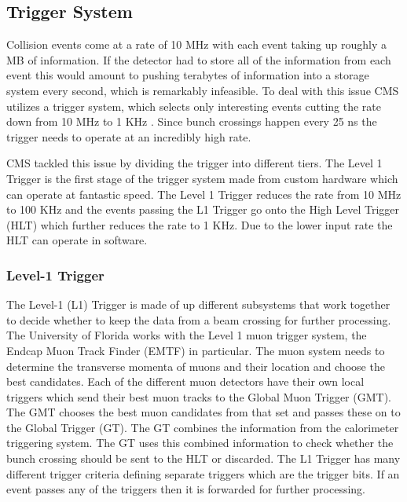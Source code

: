 \subsection{Trigger System}
Collision events come at a rate of 10 MHz with each event taking up roughly a MB of information. If the detector had to store all of the information from each event this would amount to pushing terabytes of information into a storage system every second, which is remarkably infeasible. To deal with this issue CMS utilizes a trigger system, which selects only interesting events cutting the rate down from 10 MHz to 1 KHz \cite{cmsexp}. Since bunch crossings happen every 25 ns the trigger needs to operate at an incredibly high rate.

CMS tackled this issue by dividing the trigger into different tiers. The Level 1 Trigger is the first stage of the trigger system made from custom hardware which can operate at fantastic speed. The Level 1 Trigger reduces the rate from 10 MHz to 100 KHz and the events passing the L1 Trigger go onto the High Level Trigger (HLT) which further reduces the rate to 1 KHz. Due to the lower input rate the HLT can operate in software.

\subsubsection{Level-1 Trigger}

The Level-1 (L1) Trigger is made of up different subsystems that work together to decide whether to keep the data from a beam crossing for further processing. The University of Florida works with the Level 1 muon trigger system, the Endcap Muon Track Finder (EMTF) in particular. The muon system needs to determine the transverse momenta of muons and their location and choose the best candidates. Each of the different muon detectors have their own local triggers which send their best muon tracks to the Global Muon Trigger (GMT). The GMT chooses the best muon candidates from that set and passes these on to the Global Trigger (GT). The GT combines the information from the calorimeter triggering system. The GT uses this combined information to check whether the bunch crossing should be sent to the HLT or discarded. The L1 Trigger has many different trigger criteria defining separate triggers which are the trigger bits. If an event passes any of the triggers then it is forwarded for further processing.

